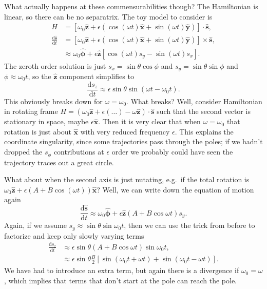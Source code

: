 \documentclass[11pt,
        usenames, %
        dvipsnames %
    ]{article}
\newcommand*{\rd}[2]{\frac{\mathrm{d}#1}{\mathrm{d}#2}}
\newcommand*{\bm}[1]{\boldsymbol{\mathbf{#1}}}
\newcommand*{\uv}[1]{\hat{\bm{#1}}}
\newcommand*{\p}[1]{\left(#1\right)}
\newcommand*{\s}[1]{\left[#1\right]}
\begin{document}
What actually happens at these commensurabilities though? The Hamiltonian is
linear, so there can be no separatrix. The toy model to consider is
\begin{align}
    H &= \s{\omega_0 \uv{z} + \epsilon \p{\cos\p{\omega t}\uv{x} + \sin\p{\omega
            t}\uv{y}}} \cdot \uv{s},\\
    \rd{\uv{s}}{t} &= \s{\omega_0 \uv{z} + \epsilon \p{\cos\p{\omega t}\uv{x} +
            \sin\p{\omega t}\uv{y}}} \times \uv{s},\\
        &\approx \omega_0 \uv{\phi} + \epsilon\uv{z}\s{
            \cos \p{\omega t} s_y - \sin \p{\omega t} s_x}.
\end{align}
The zeroth order solution is just $s_x = \sin \theta \cos \phi$ and $s_y = \sin
\theta \sin \phi$ and $\phi \approx \omega_0 t$, so the $\uv{z}$ component
simplifies to
\begin{equation}
    \rd{s_z}{t} \approx \epsilon \sin \theta \sin\p{\omega t -
        \omega_0 t}.
\end{equation}
This obviously breaks down for $\omega = \omega_0$. What breaks? Well, consider
Hamiltonian in rotating frame $H = \p{\omega_0 \uv{z} + \epsilon \p{\dots}-
\omega \uv{z}} \cdot \uv{s}$ such that the second vector is stationary in space,
maybe $\epsilon \uv{x}$. Then it is very clear that when $\omega = \omega_0$
that rotation is just about $\uv{x}$ with very reduced frequency $\epsilon$.
This explains the coordinate singularity, since some trajectories pass through
the poles; if we hadn't dropped the $s_\phi$ contributions at $\epsilon$ order
we probably could have seen the trajectory traces out a great circle.

What about when the second axis is just nutating, e.g.\ if the total rotation is
$\omega_0 \uv{z} + \epsilon \p{A + B \cos \p{\omega t}}\uv{x}$? Well, we can
write down the equation of motion again
\begin{equation}
    \rd{\uv{s}}{t} \approx \omega_0 \uv{\phi}
        + \epsilon \uv{z}\p{A + B \cos \omega t}s_y.
\end{equation}
Again, if we assume $s_y \approx \sin \theta \sin \omega_0 t$, then we can use
the trick from before to factorize and keep only slowly varying terms
\begin{align}
    \rd{s_z}{t} &\approx \epsilon \sin \theta\p{A + B \cos \omega t}
            \sin \omega_0 t,\\
        &\approx \epsilon \sin \theta \frac{B}{2}\s{
            \sin \p{\omega_0 t + \omega t} + \sin\p{\omega_0 t - \omega t}}.
\end{align}
We have had to introduce an extra term, but again there is a divergence if
$\omega_0 = \omega$, which implies that terms that don't start at the pole can
reach the pole.
\end{document}
